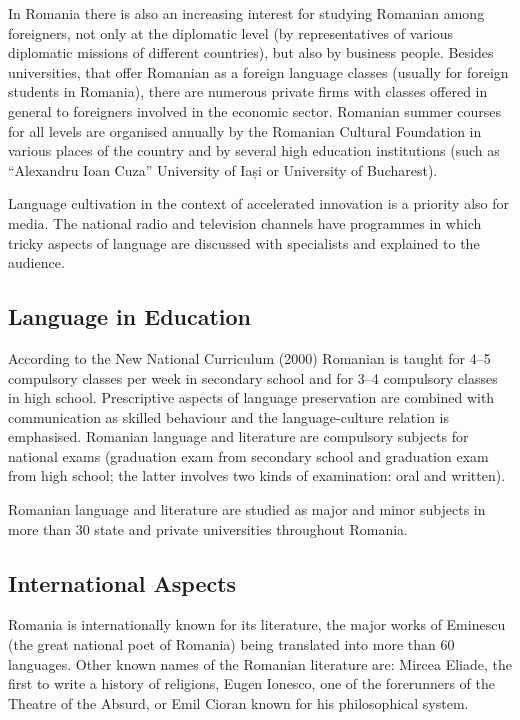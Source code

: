 \begin{multicols}{2}
In Romania there is also an increasing interest for studying Romanian among foreigners, not only at the diplomatic level (by representatives of various diplomatic missions of different countries), but also by business people. Besides universities, that offer Romanian as a foreign language classes (usually for foreign students in Romania), there are numerous private firms with classes offered in general to foreigners involved in the economic sector. Romanian summer courses for all levels are organised annually by the Romanian Cultural Foundation in various places of the country and by several high education institutions (such as ``Alexandru Ioan Cuza'' University of Iași or University of Bucharest).

Language cultivation in the context of accelerated innovation is a priority also for media. The national radio and television channels have programmes in which tricky aspects of language are discussed with specialists and explained to the audience.

\subsection{Language in Education}

According to the New National Curriculum (2000) Romanian is taught for 4--5 compulsory classes per week in secondary school and for 3--4 compulsory classes in high school. Prescriptive aspects of language preservation are combined with communication as skilled behaviour and the language-culture relation is emphasised. Romanian language and literature are compulsory subjects for national exams (graduation exam from secondary school and graduation exam from high school; the latter involves two kinds of examination: oral and written).

Romanian language and literature are studied as major and minor subjects in more than 30 state and private universities throughout Romania.

\subsection{International Aspects}

Romania is internationally known for its literature, the major works of Eminescu (the great national poet of Romania) being translated into more than 60 languages. Other known names of the Romanian literature are: Mircea Eliade, the first to write a history of religions, Eugen Ionesco, one of the forerunners of the Theatre of the Absurd, or Emil Cioran known for his philosophical system. 


\end{multicols}
